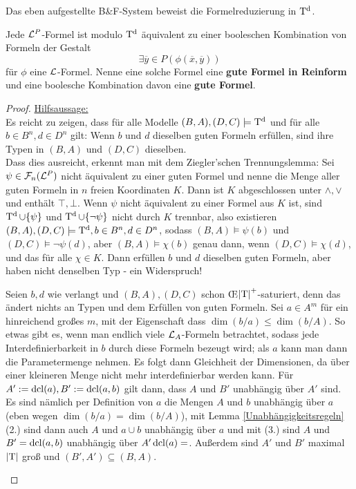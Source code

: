 Das eben aufgestellte B\&F-System beweist die Formelreduzierung in $\operatorname{T^d}$.
\begin{theorem}\label{Formelreduzierung}
	Jede $\mathcal{L}^P$-Formel ist modulo $\operatorname{T^d}$ äquivalent zu einer booleschen Kombination von Formeln der Gestalt
	$$\exists\overline{y}\in P(\phi(\overline{x},\overline{y}))$$
	für $\phi$ eine $\mathcal{L}$-Formel. Nenne eine solche Formel eine \textbf{gute Formel in Reinform} und eine boolesche Kombination davon eine \textbf{gute Formel}.
\end{theorem}
\begin{proof}
	\underline{Hilfsaussage:}\\
	Es reicht zu zeigen, dass für alle Modelle $(B,A),(D,C)\models\operatorname{T^d}$ und für alle $b\in B^n,d\in D^n$ gilt: Wenn $b$ und $d$ dieselben guten Formeln erfüllen, sind ihre Typen in $(B,A)$ und $(D,C)$ dieselben.\\
	Dass dies ausreicht, erkennt man mit dem Ziegler'schen Trennungslemma: Sei $\psi\in\mathcal{F}_n(\mathcal{L}^P)$ nicht äquivalent zu einer guten Formel und nenne die Menge aller guten Formeln in $n$ freien Koordinaten $K$. Dann ist $K$ abgeschlossen unter $\land,\lor$ und enthält $\top,\bot$. Wenn $\psi$ nicht äquivalent zu einer Formel aus $K$ ist, sind $\operatorname{T^d}\cup\{\psi\}$ und $\operatorname{T^d}\cup\{\neg\psi\}$ nicht durch $K$ trennbar, also existieren $(B,A),(D,C)\models\operatorname{T^d},b\in B^n,d\in D^n$, sodass $(B,A)\models\psi(b)$ und $(D,C)\models\neg\psi(d)$, aber $(B,A)\models\chi(b)$ genau dann, wenn $(D,C)\models\chi(d)$, und das für alle $\chi\in K$. Dann erfüllen $b$ und $d$ dieselben guten Formeln, aber haben nicht denselben Typ - ein Widerspruch!\\
	\begin{proof2}
		Seien $b,d$ wie verlangt und $(B,A),(D,C)$ schon \OE\linebreak ${\left| \operatorname{T} \right|}^+$-saturiert, denn das ändert nichts an Typen und dem Erfüllen von guten Formeln. Sei $a\in A^m$ für ein hinreichend großes $m$, mit der Eigenschaft dass $\dim(b/a)\leq\dim(b/A)$. So etwas gibt es, wenn man endlich viele $\mathcal{L}_A$-Formeln betrachtet, sodass jede Interdefinierbarkeit in $b$ durch diese Formeln bezeugt wird; als $a$ kann man dann die Parametermenge nehmen. Es folgt dann Gleichheit der Dimensionen, da über einer kleineren Menge nicht mehr interdefinierbar werden kann. Für $A':=\operatorname{dcl}(a),B':=\operatorname{dcl}(a,b)$ gilt dann, dass $A$ und $B'$ unabhängig über $A'$ sind. Es sind nämlich per Definition von $a$ die Mengen $A$ und $b$ unabhängig über $a$ (eben wegen $\dim(b/a)=\dim(b/A)$), mit Lemma \ref{Unabhängigkeitsregeln} (2.) sind dann auch $A$ und $a\cup b$ unabhängig über $a$ und mit (3.) sind $A$ und $B'=\operatorname{dcl}(a,b)$ unabhängig über $A'\operatorname{dcl}(a)=$. Außerdem sind $A'$ und $B'$ maximal ${\left| \operatorname{T} \right|}$ groß und $(B',A')\subseteq (B,A)$.\newpage

\end{proof2}
\end{proof}

